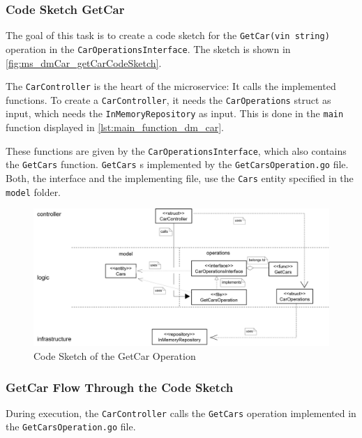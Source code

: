 \subsubsection*{Code Sketch GetCar}
The goal of this task is to create a code sketch for the \texttt{GetCar(vin string)} operation in the \texttt{CarOperationsInterface}.
The sketch is shown in \autoref*{fig:ms_dmCar_getCarCodeSketch}.

The \texttt{CarController} is the heart of the microservice:
It calls the implemented functions.
To create a \texttt{CarController}, it needs the \texttt{CarOperations} struct as input, which needs the \texttt{InMemoryRepository} as input.
This is done in the \texttt{main} function displayed in \autoref*{lst:main_function_dm_car}.

These functions are given by the \texttt{CarOperationsInterface}, which also contains the \texttt{GetCars} function.
\texttt{GetCars} s implemented by the \texttt{GetCarsOperation.go} file.
Both, the interface and the implementing file, use the \texttt{Cars} entity specified in the \texttt{model} folder.

\begin{figure}
    \centering
    \includegraphics[width=\textwidth]{figures/microservices/dmCar/ms_dmCar_codeSketchGetCar.png}
    \caption{Code Sketch of the GetCar Operation}
    \label{fig:ms_dmCar_getCarCodeSketch}
\end{figure}
\subsubsection*{GetCar Flow Through the Code Sketch}
During execution, the \texttt{CarController} calls the \texttt{GetCars} operation implemented in the \texttt{GetCarsOperation.go} file.

